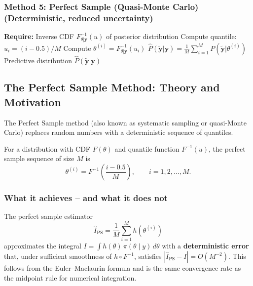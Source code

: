 \subsubsection*{Method 5: Perfect Sample (Quasi-Monte Carlo) (Deterministic, reduced uncertainty)}
\begin{algorithmbox}
\begin{algorithm}[H]
\begin{algorithmic}[1]
\State \textbf{Require:} Inverse CDF $F_{\theta|\mathbf{y}}^{-1}(u)$ of posterior distribution
    \State Compute quantile: $u_i = (i - 0.5) / M$ 
    \State Compute $\theta^{(i)} = F_{\theta|\mathbf{y}}^{-1}(u_i)$ 
\EndFor
{}
    \State $\hat{P}(\tilde{\mathbf{y}}|\mathbf{y}) = \frac{1}{M}\sum_{i=1}^M P(\tilde{\mathbf{y}}|\theta^{(i)})$ 
\EndFor
\State \Return Predictive distribution $\hat{P}(\tilde{\mathbf{y}}|\mathbf{y})$
\end{algorithmic}
\end{algorithm}
\end{algorithmbox}

\subsection{The Perfect Sample Method: Theory and Motivation}
The Perfect Sample method (also known as systematic sampling or quasi-Monte Carlo) replaces random numbers with a deterministic sequence of quantiles.

\begin{definition}
For a distribution with CDF \(F(\theta)\) and quantile function \(F^{-1}(u)\), the perfect sample sequence of size \(M\) is
\[
\theta^{(i)} = F^{-1}\!\left(\frac{i-0.5}{M}\right),\qquad i=1,2,\ldots,M.
\]
\end{definition}

\subsubsection*{What it achieves – and what it does not}
The perfect sample estimator
\[
\hat{I}_{\text{PS}} = \frac{1}{M}\sum_{i=1}^{M} h(\theta^{(i)})
\]
approximates the integral \(I = \int h(\theta)\,\pi(\theta\mid y)\,d\theta\) with a \textbf{deterministic error} that, under sufficient smoothness of \(h\circ F^{-1}\), satisfies \(|\hat{I}_{\text{PS}} - I| = O(M^{-2})\). This follows from the Euler--Maclaurin formula and is the same convergence rate as the midpoint rule for numerical integration.

